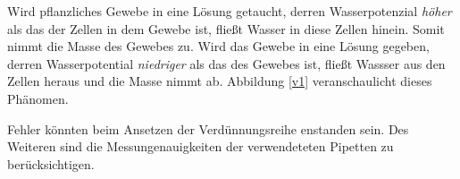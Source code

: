 \documentclass[11pt,a4paper,DIV=10,]{scrartcl}
\begin{document}
Wird pflanzliches Gewebe in eine Lösung getaucht, derren Wasserpotenzial \textit{höher} als das der Zellen in dem Gewebe ist, fließt Wasser in diese Zellen hinein. Somit nimmt die Masse des Gewebes zu. Wird das Gewebe in eine Lösung gegeben, derren Wasserpotential \textit{niedriger} als das des Gewebes ist, fließt Wassser aus den Zellen heraus und die Masse nimmt ab. Abbildung \ref{v1} veranschaulicht dieses Phänomen. 

Fehler könnten beim Ansetzen der Verdünnungsreihe enstanden sein. Des Weiteren sind die
Messungenauigkeiten der verwendeteten Pipetten zu berücksichtigen. 


\end{document}

